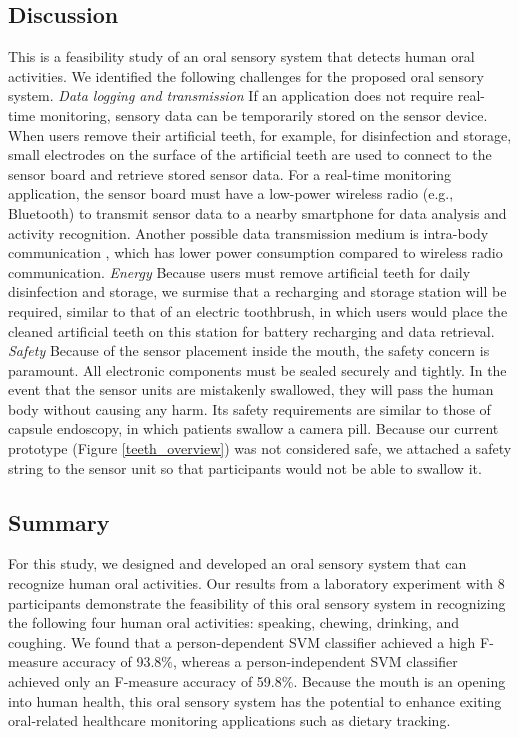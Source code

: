 \subsection{Discussion}
This is a feasibility study of an oral sensory system that detects human oral activities. We identified the following challenges for the proposed oral sensory system.
\newline
\textit{Data logging and transmission}
\newline
If an application does not require real-time monitoring, sensory data can be temporarily stored on the sensor device. When users remove their artificial teeth, for example, for disinfection and storage, small electrodes on the surface of the artificial teeth are used to connect to the sensor board and retrieve stored sensor data. For a real-time monitoring application, the sensor board must have a low-power wireless radio (e.g., Bluetooth) to transmit sensor data to a nearby smartphone for data analysis and activity recognition. Another possible data transmission medium is intra-body communication \cite{Hachisuka:2003}, which has lower power consumption compared to wireless radio communication.
\newline
\textit{Energy}
\newline
Because users must remove artificial teeth for daily disinfection and storage, we surmise that a recharging and storage station will be required, similar to that of an electric toothbrush, in which users would place the cleaned artificial teeth on this station for battery recharging and data retrieval. 
\newline
\textit{Safety}
\newline
Because of the sensor placement inside the mouth, the safety concern is paramount. All electronic components must be sealed securely and tightly. In the event that the sensor units are mistakenly swallowed, they will pass the human body without causing any harm. Its safety requirements are similar to those of capsule endoscopy, in which patients swallow a camera pill. Because our current prototype (Figure \ref{teeth_overview}) was not considered safe, we attached a safety string to the sensor unit so that participants would not be able to swallow it.

\subsection{Summary}
For this study, we designed and developed an oral sensory system that can recognize human oral activities. Our results from a laboratory experiment with 8 participants demonstrate the feasibility of this oral sensory system in recognizing the following four human oral activities: speaking, chewing, drinking, and coughing. We found that a person-dependent SVM classifier achieved a high F-measure accuracy of 93.8$\%$, whereas a person-independent SVM classifier achieved only an F-measure accuracy of 59.8$\%$. 
Because the mouth is an opening into human health, this oral sensory system has the potential to enhance exiting oral-related healthcare monitoring applications such as dietary tracking. 




